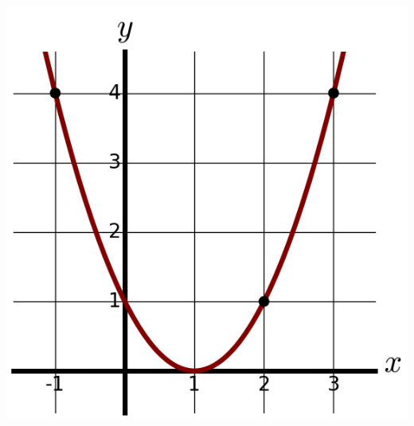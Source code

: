  \begin{minipage}{0.3\textwidth}
     \includegraphics[width=\textwidth]{img/chap1/sec1-2/ex117.png}
\end{minipage}

